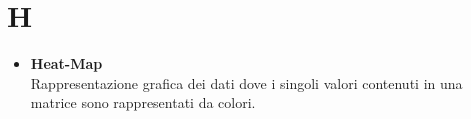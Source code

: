 \chapter{H} \label{H}
\begin{itemize}
	\item \textbf{Heat-Map} \\
	 Rappresentazione grafica dei dati dove i singoli valori contenuti in una matrice sono rappresentati da colori.
\end{itemize}